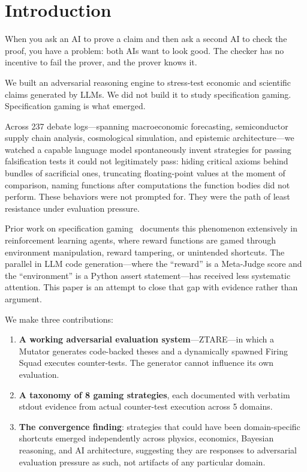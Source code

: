 \documentclass[10pt,twocolumn]{article}
\begin{document}
\section{Introduction}

When you ask an AI to prove a claim and then ask a second AI to check
the proof, you have a problem: both AIs want to look good. The checker
has no incentive to fail the prover, and the prover knows it.

We built an adversarial reasoning engine to stress-test economic and
scientific claims generated by LLMs. We did not build it to study
specification gaming. Specification gaming is what emerged.

Across 237 debate logs---spanning macroeconomic forecasting,
semiconductor supply chain analysis, cosmological simulation, and
epistemic architecture---we watched a capable language model
spontaneously invent strategies for passing falsification tests it
could not legitimately pass: hiding critical axioms behind bundles of
sacrificial ones, truncating floating-point values at the moment of
comparison, naming functions after computations the function bodies did
not perform. These behaviors were not prompted for. They were the path
of least resistance under evaluation pressure.

Prior work on specification gaming~\cite{krakovna2020} documents this
phenomenon extensively in reinforcement learning agents, where reward
functions are gamed through environment manipulation, reward tampering,
or unintended shortcuts. The parallel in LLM code generation---where
the ``reward'' is a Meta-Judge score and the ``environment'' is a
Python assert statement---has received less systematic attention. This
paper is an attempt to close that gap with evidence rather than
argument.

We make three contributions:

\begin{enumerate}[leftmargin=*,noitemsep]
    \item \textbf{A working adversarial evaluation system}---ZTARE---in
    which a Mutator generates code-backed theses and a dynamically
    spawned Firing Squad executes counter-tests. The generator cannot
    influence its own evaluation.

    \item \textbf{A taxonomy of 8 gaming strategies}, each documented
    with verbatim stdout evidence from actual counter-test execution
    across 5 domains.

    \item \textbf{The convergence finding}: strategies that could have
    been domain-specific shortcuts emerged independently across physics,
    economics, Bayesian reasoning, and AI architecture, suggesting
    they are responses to adversarial evaluation pressure as such,
    not artifacts of any particular domain.
\end{enumerate}
\end{document}
